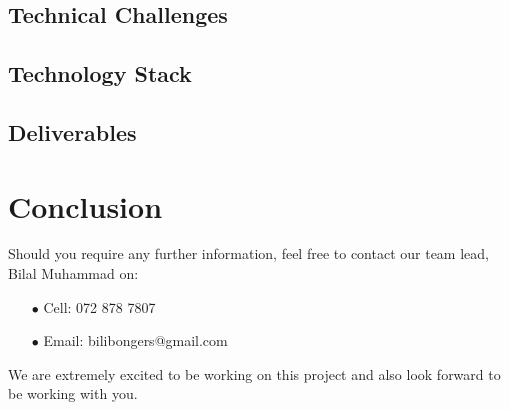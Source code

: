 \documentclass[a4paper,12pt]{article}
\begin{document}
	\subsection{Technical Challenges}
	
	\newpage
	\subsection{Technology Stack}
	
	\newpage
	\subsection{Deliverables}
	
	
	\newpage
	\section{Conclusion}
	
	Should you require any further information, feel free to contact our team lead, Bilal Muhammad on:
	
	\begin{itemize}
		\item[$\bullet$]Cell: 072 878 7807
		\item[$\bullet$]Email: bilibongers@gmail.com
	\end{itemize}
	We are extremely excited to be working on this project and also look forward to be working with you.
	
	
\end{document}
